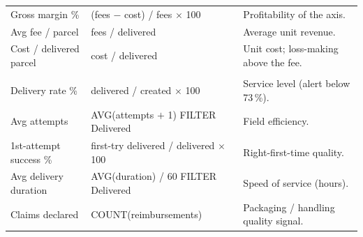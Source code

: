 \begin{xltabular}{\linewidth}{|>{\raggedright\arraybackslash}p{3.0cm}|>{\raggedright\arraybackslash}X|>{\raggedright\arraybackslash}p{3.6cm}|}
Gross margin \% & (fees $-$ cost) / fees $\times$ 100 & Profitability of the axis. \\
Avg fee / parcel & fees / delivered & Average unit revenue. \\
Cost / delivered parcel & cost / delivered & Unit cost; loss-making above the fee. \\
\hline
{} \\
\hline
Delivery rate \% & delivered / created $\times$ 100 & Service level (alert below 73\,\%). \\
Avg attempts & AVG(attempts $+$ 1) FILTER Delivered & Field efficiency. \\
1st-attempt success \% & first-try delivered / delivered $\times$ 100 & Right-first-time quality. \\
Avg delivery duration & AVG(duration) / 60 FILTER Delivered & Speed of service (hours). \\
Claims declared & COUNT(reimbursements) & Packaging / handling quality signal. \\
\hline
\end{xltabular}
\endgroup

